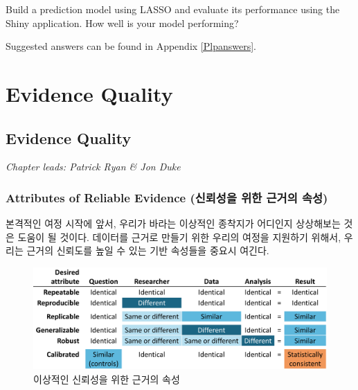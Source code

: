 \documentclass[11pt]{book}
\theoremstyle{definition}
\theoremstyle{definition}
\theoremstyle{definition}
\theoremstyle{remark}
\let\BeginKnitrBlock\begin \let\EndKnitrBlock\end
\begin{document}
\BeginKnitrBlock{exercise}
\protect\hypertarget{exr:exercisePlp3}{}{\label{exr:exercisePlp3} }Build a
prediction model using LASSO and evaluate its performance using the
Shiny application. How well is your model performing?
\EndKnitrBlock{exercise}

Suggested answers can be found in Appendix \ref{Plpanswers}.

\part{Evidence Quality}\label{part-evidence-quality}

\chapter{Evidence Quality}\label{EvidenceQuality}

\emph{Chapter leads: Patrick Ryan \& Jon Duke}


\section{Attributes of Reliable Evidence (신뢰성을 위한 근거의
속성)}\label{attributes-of-reliable-evidence----}

본격적인 여정 시작에 앞서, 우리가 바라는 이상적인 종착지가 어디인지
상상해보는 것은 도움이 될 것이다. 데이터를 근거로 만들기 위한 우리의
여정을 지원하기 위해서, 우리는 근거의 신뢰도를 높일 수 있는 기반
속성들을 중요시 여긴다.

\begin{figure}

{\centering \includegraphics[width=1\linewidth]{images/EvidenceQuality/reliableevidenceattributes} 

}

\caption{이상적인 신뢰성을 위한 근거의 속성}\label{fig:attributesOfEvidence}
\end{figure}
\end{document}

